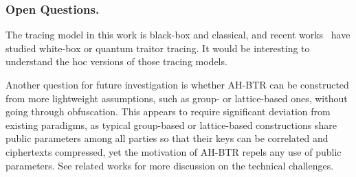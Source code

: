 \subsubsection{Open Questions.}
The tracing model in this work is black-box and classical, and recent works~\cite{C:Zhandry21,TCC:Zhandry20} have studied white-box or quantum traitor tracing.
It would be interesting to understand the \ad hoc versions of those tracing models.

Another question for future investigation is whether
AH-BTR can be constructed from more lightweight assumptions,
such as group- or lattice-based ones,
without going through obfuscation.
This appears to require significant deviation from existing paradigms,
as typical group-based or lattice-based constructions
share public parameters among all parties
so that their keys can be correlated and ciphertexts compressed,
yet the motivation of AH-BTR repels any use of public parameters.
See related works for more discussion on the technical challenges.
